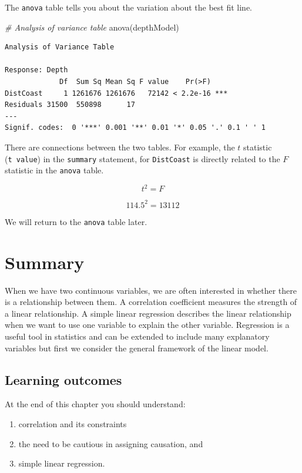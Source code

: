 \documentclass[
  oneside]{krantz}
\newenvironment{Shaded}{\begin{snugshade}}{\end{snugshade}}
\newcommand{\CommentTok}[1]{\textcolor[rgb]{0.56,0.35,0.01}{\textit{#1}}}
\newcommand{\FunctionTok}[1]{\textcolor[rgb]{0.00,0.00,0.00}{#1}}
\newcommand{\NormalTok}[1]{#1}
\providecommand{\tightlist}{%
  \setlength{\itemsep}{0pt}\setlength{\parskip}{0pt}}
\begin{document}
The \texttt{anova} table tells you about the variation about the best fit line.

\begin{Shaded}
\begin{Highlighting}[]
\CommentTok{\# Analysis of variance table}
\FunctionTok{anova}\NormalTok{(depthModel)}
\end{Highlighting}
\end{Shaded}

\begin{verbatim}
Analysis of Variance Table

Response: Depth
             Df  Sum Sq Mean Sq F value    Pr(>F)    
DistCoast     1 1261676 1261676   72142 < 2.2e-16 ***
Residuals 31500  550898      17                      
---
Signif. codes:  0 '***' 0.001 '**' 0.01 '*' 0.05 '.' 0.1 ' ' 1
\end{verbatim}

There are connections between the two tables. For example, the \(t\) statistic (\texttt{t\ value}) in the \texttt{summary} statement, for \texttt{DistCoast} is directly related to the \(F\) statistic in the \texttt{anova} table.

\[t^2 = F\]

\[114.5^2 = 13112\]

We will return to the \texttt{anova} table later.

\hypertarget{SUMcorreg}{%
\section{Summary}\label{SUMcorreg}}

When we have two continuous variables, we are often interested in whether there is a relationship between them. A correlation coefficient measures the strength of a linear relationship. A simple linear regression describes the linear relationship when we want to use one variable to explain the other variable. Regression is a useful tool in statistics and can be extended to include many explanatory variables but first we consider the general framework of the linear model.

\hypertarget{learning-outcomes-9}{%
\subsection{Learning outcomes}\label{learning-outcomes-9}}

At the end of this chapter you should understand:

\begin{enumerate}
\def\labelenumi{\arabic{enumi}.}
\tightlist
\item
  correlation and its constraints
\item
  the need to be cautious in assigning causation, and
\item
  simple linear regression.
\end{enumerate}
\end{document}
